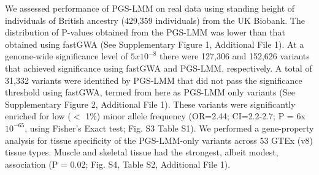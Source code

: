 \documentclass[doublespacing]{bmcart}
\begin{document}
We assessed performance of PGS-LMM on real data using standing height of individuals of British ancestry (429,359 individuals) from the UK Biobank. The distribution of P-values obtained from the PGS-LMM was lower than that obtained using fastGWA (See Supplementary  Figure 1, Additional File 1). At a genome-wide significance level of $5x10^{-8}$ there were 127,306 and 152,626 variants that achieved significance using fastGWA and PGS-LMM, respectively. A total of 31,332 variants were identified by PGS-LMM that did not pass the significance threshold using fastGWA, termed from here as PGS-LMM only variants (See Supplementary  Figure 2, Additional File 1).  These variants were significantly enriched for low ($<$ 1\%) minor allele frequency (OR=2.44; CI=2.2-2.7; P = 6x$10^{-65}$, using Fisher’s Exact test; Fig. S3 Table S1).  We performed a gene-property analysis for tissue specificity of the PGS-LMM-only variants across 53 GTEx (v8) tissue types. Muscle and skeletal tissue had the strongest, albeit modest, association (P = 0.02; Fig. S4, Table S2, Additional File 1).  
\end{document}
